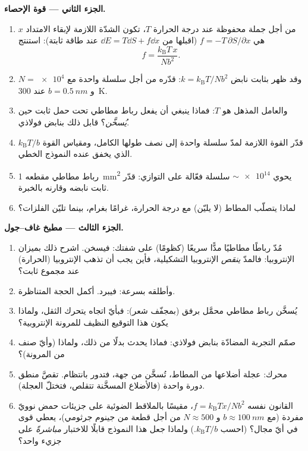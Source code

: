 \begin{problem}
\medskip\noindent\textbf{الجزء الثاني --- قوة الإحصاء.}
\begin{enumerate}[resume]
  \item من أجل جملة محفوظة عند درجة الحرارة $T$، تكون الشدّة اللازمة
        لإبقاء الامتداد $x$ هي $f = -T\,\partial S/\partial x$
        (اقبلها من $\dd E = T\dd S + f\dd x$ عند طاقة ثابتة): استنتج
        \[
        f = \frac{k_{\text{B}}T\,x}{Nb^2} .
        \]
  \item وقد ظهر  بثابت نابض $k =
        k_{\text{B}}T/Nb^2$: قدّره من أجل سلسلة واحدة مع $N =
        \num{e4}$ و $b = \qty{0.5}{nm}$ عند \qty{300}{K}.
  \item والعامل المذهل هو $T$: فماذا ينبغي أن يفعل رباط مطاطي
        تحت حمل ثابت حين \emph{يُسخَّن}؟ قابل ذلك بنابض فولاذي.
  \item قدّر القوة اللازمة لمدّ سلسلة واحدة إلى نصف طولها
        الكامل، ومقياس القوة $k_{\text{B}}T/b$ الذي يخفق عنده
        النموذج الخطي.
  \item رباط مطاطي مقطعه \qty{1}{mm^2} يحوي
        $\sim\num{e14}$ سلسلة فعّالة على التوازي: قدّر
        ثابت نابضه وقارنه بالخبرة.
  \item لماذا يتصلّب المطاط (لا يليّن) مع درجة الحرارة،
        غرامًا بغرام، بينما تليّن الفلزات؟
\end{enumerate}

\medskip\noindent\textbf{الجزء الثالث --- مطبخ غاف--جول.}
\begin{enumerate}[resume]
  \item مُدّ رباطًا مطاطيًا مدًّا سريعًا (كظومًا) على شفتك:
        فيسخن. اشرح ذلك بميزان الإنتروبيا: فالمدّ
        \emph{ينقص} الإنتروبيا التشكيلية، فأين يجب أن تذهب
        الإنتروبيا (الحرارة) عند مجموع ثابت؟
  \item وأطلقه بسرعة: فيبرد. أكمل الحجة المتناظرة.
  \item يُسخَّن رباط مطاطي محمَّل برفق (بمجفّف شعر): فبأيّ
        اتجاه يتحرك الثقل، ولماذا يكون هذا التوقيع النظيف
        للمرونة الإنتروبية؟
  \item صمّم التجربة المضادّة بنابض فولاذي: فماذا
        يحدث بدلًا من ذلك، ولماذا (وأيّ صنف من المرونة)؟
  \item محرك: عجلة أضلاعها من المطاط، تُسخَّن من جهة،
        فتدور بانتظام. تقصَّ منطق دورة واحدة (فالأضلاع المسخَّنة
        تتقلص، فتختلّ العجلة).
  \item القانون نفسه $f = k_{\text{B}}Tx/Nb^2$، مقيسًا بالملاقط
        الضوئية على جزيئات حمض نوويّ مفردة (مع $b \approx
        \qty{100}{nm}$ و $N \approx 500$ من أجل قطعة من جينوم
        جرثومي)، يعطي قوى في أيّ مجال؟ (احسب
        $k_{\text{B}}T/b$.) ولماذا جعل هذا النموذج قابلًا
        للاختبار \emph{مباشرةً} على جزيء واحد؟
\end{enumerate}


\end{problem}
